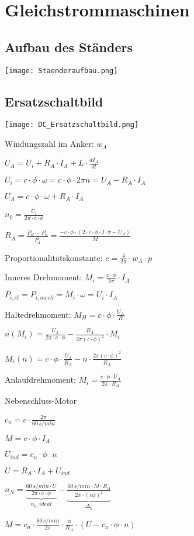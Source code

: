 \documentclass[german]{latex4ei/latex4ei_sheet}
\begin{document}
	\section{Gleichstrommaschinen}
		\begin{sectionbox}
			\subsection{Aufbau des Ständers}
				\texttt{[image: Staenderaufbau.png]}
			\subsection{Ersatzschaltbild}
				\texttt{[image: DC\_Ersatzschaltbild.png]}
				\begin{symbolbox}
					\item Windungszahl im Anker: $w_A$
					\item $U_A = U_i +R_A\cdot I_A+L\cdot \frac{dI_A}{dt}$
					\item $U_i = c\cdot \phi \cdot \omega = c \cdot \phi \cdot 2\pi n = U_A - R_A\cdot I_A$
					\item $U_A = c\cdot \phi \cdot \omega +R_A\cdot I_A$
					\item $n_0 = \frac{U_i}{2\pi\cdot c\cdot \phi}$
					\item $R_A = \frac{P_{el}-P_n}{I_A^2} = \frac{-c\cdot \phi\cdot (2\cdot c\cdot \phi \cdot I\cdot \pi - U_A)}{M}$
					\item Proportionalitätskonstante: $c =\frac{4}{2\pi}\cdot w_A\cdot p$
					\item Inneres Drehmoment: $M_i = \frac{c\cdot \phi}{2\pi} \cdot I_A$
					\item $ P_{i, el} = P_{i, mech} = M_i \cdot \omega = U_i\cdot I_A$
					\item Haltedrehmoment: $M_H = c\cdot \phi \cdot \frac{U_A}{R}$
					\item $n(M_i) = \frac{U_A}{2\pi\cdot c\cdot \phi}-\frac{R_A}{2\pi(c\cdot \phi)^2}\cdot M_i$
					\item $M_i(n) = c\cdot \phi\cdot \frac{U_A}{R_A}-n\cdot \frac{2\pi(c\cdot \phi)^2}{R_A}$
					\item Anlaufdrehmoment: $M_i = \frac{c\cdot \phi \cdot U_A}{2\pi \cdot R_A}$
				\end{symbolbox}

				\begin{bluebox}{Nebenschluss-Motor}
					\item $c_n = c\cdot \frac{2\pi}{60\,s/min}$
					\item $M = c\cdot \phi \cdot I_A$
					\item $U_{ind} = c_n \cdot \phi \cdot n$
					\item $U = R_A\cdot I_A + U_{ind}$
					\item $n_N = \underbrace{\frac{60\,s/min\cdot U}{2\pi\cdot c\cdot \phi}}_{n_0, ideal}-\underbrace{\frac{60\,s/min\cdot M\cdot R_A}{2\pi\cdot(c\phi)^2}}_{\Delta_n}$
					\item $M = c_n\cdot \frac{60\,s/min}{2\pi}\cdot \frac{\phi}{R_A}\cdot (U-c_n\cdot \phi \cdot n)$
				\end{bluebox}


\end{sectionbox}
\end{document}
